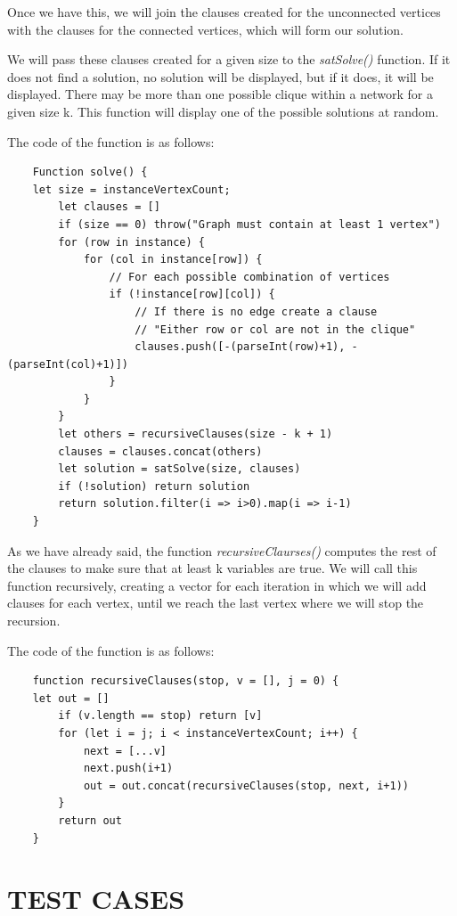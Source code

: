 \documentclass[table]{article}
\begin{document}
Once we have this, we will join the clauses created for the unconnected vertices with the clauses for the connected vertices, which will form our solution.

We will pass these clauses created for a given size to the \textit{satSolve()} function. If it does not find a solution, no solution will be displayed, but if it does, it will be displayed. There may be more than one possible clique within a network for a given size k. This function will display one of the possible solutions at random.\newline

The code of the function is as follows:

\begin{lstlisting}
    Function solve() {
	let size = instanceVertexCount;
    	let clauses = []
        if (size == 0) throw("Graph must contain at least 1 vertex")
        for (row in instance) {
            for (col in instance[row]) {
                // For each possible combination of vertices
                if (!instance[row][col]) {
                    // If there is no edge create a clause
                    // "Either row or col are not in the clique"
                    clauses.push([-(parseInt(row)+1), -(parseInt(col)+1)])
                }
            }
        }
        let others = recursiveClauses(size - k + 1)
        clauses = clauses.concat(others)
        let solution = satSolve(size, clauses)
        if (!solution) return solution 
        return solution.filter(i => i>0).map(i => i-1)
    }

\end{lstlisting}

As we have already said, the function \textit{recursiveClaurses()} computes the rest of the clauses to make sure that at least k variables are true. 
We will call this function recursively, creating a vector for each iteration in which we will add clauses for each vertex, until we reach the last vertex where we will stop the recursion.

The code of the function is as follows:

\begin{lstlisting}
    function recursiveClauses(stop, v = [], j = 0) {
    let out = []
        if (v.length == stop) return [v]
        for (let i = j; i < instanceVertexCount; i++) {
            next = [...v]
            next.push(i+1)
            out = out.concat(recursiveClauses(stop, next, i+1))
        }
        return out
    }

\end{lstlisting}


\section{TEST CASES}
\end{document}
